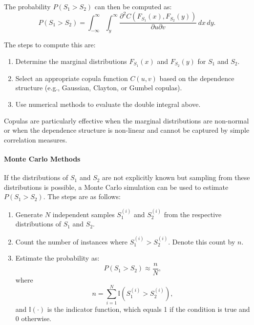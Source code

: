 The probability $P(S_1 > S_2)$ can then be computed as:
\begin{equation}
P(S_1 > S_2) = \int_{-\infty}^\infty \int_{y}^\infty \frac{\partial^2 C(F_{S_1}(x), F_{S_2}(y))}{\partial u \partial v} \, dx \, dy.
\end{equation}

The steps to compute this are:
\begin{enumerate}
    \item Determine the marginal distributions $F_{S_1}(x)$ and $F_{S_2}(y)$ for $S_1$ and $S_2$.
    \item Select an appropriate copula function $C(u, v)$ based on the dependence structure (e.g., Gaussian, Clayton, or Gumbel copulas).
    \item Use numerical methods to evaluate the double integral above.
\end{enumerate}

Copulas are particularly effective when the marginal distributions are non-normal or when the dependence structure is non-linear and cannot be captured by simple correlation measures.

\paragraph{Monte Carlo Methods}

If the distributions of $S_1$ and $S_2$ are not explicitly known but sampling from these distributions is possible, a Monte Carlo simulation can be used to estimate $P(S_1 > S_2)$. The steps are as follows:
\begin{enumerate}
    \item Generate $N$ independent samples $S_1^{(i)}$ and $S_2^{(i)}$ from the respective distributions of $S_1$ and $S_2$.
    \item Count the number of instances where $S_1^{(i)} > S_2^{(i)}$. Denote this count by $n$.
    \item Estimate the probability as:
    \begin{equation}
    P(S_1 > S_2) \approx \frac{n}{N},
    \end{equation}
    where
    \begin{equation}
    n = \sum_{i=1}^N \mathbb{I}(S_1^{(i)} > S_2^{(i)}),
    \end{equation}
    and $\mathbb{I}(\cdot)$ is the indicator function, which equals 1 if the condition is true and 0 otherwise.
\end{enumerate}

